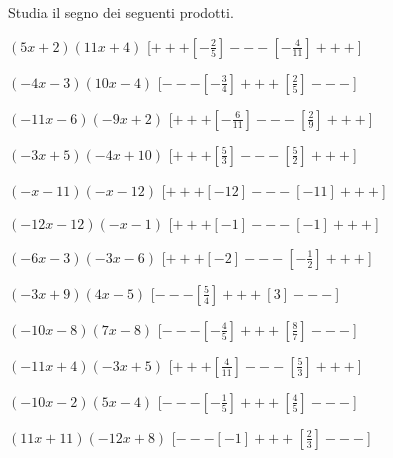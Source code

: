 \begin{esercizio}\label{ese:dis_6}
 Studia il segno dei seguenti prodotti.
 \begin{enumeratea}
  \item  $\left(5 x +2\right)\left(11 x +4\right)$ \hfill 
  [$+++\left [-\frac{2}{5} \right ]---\left [-\frac{4}{11} \right ]+++$]
  \item  $\left(-4 x -3\right)\left(10 x -4\right)$ \hfill 
  [$---\left [-\frac{3}{4} \right ]+++\left [\frac{2}{5} \right ]---$]
  \item  $\left(-11 x -6\right)\left(-9 x +2\right)$ \hfill 
  [$+++\left [-\frac{6}{11} \right ]---\left [\frac{2}{9} \right ]+++$]
  \item  $\left(-3 x +5\right)\left(-4 x +10\right)$ \hfill 
  [$+++\left [\frac{5}{3} \right ]---\left [\frac{5}{2} \right ]+++$]
  \item  $\left(- x -11\right)\left(- x -12\right)$ \hfill 
  [$+++\left [-12 \right ]---\left [-11 \right ]+++$]
  \item  $\left(-12 x -12\right)\left(- x -1\right)$ \hfill 
  [$+++\left [-1 \right ]---\left [-1 \right ]+++$]
  \item  $\left(-6 x -3\right)\left(-3 x -6\right)$ \hfill 
  [$+++\left [-2 \right ]---\left [-\frac{1}{2} \right ]+++$]
  \item  $\left(-3 x +9\right)\left(4 x -5\right)$ \hfill 
  [$---\left [\frac{5}{4} \right ]+++\left [3 \right ]---$]
  \item  $\left(-10 x -8\right)\left(7 x -8\right)$ \hfill 
  [$---\left [-\frac{4}{5} \right ]+++\left [\frac{8}{7} \right ]---$]
  \item  $\left(-11 x +4\right)\left(-3 x +5\right)$ \hfill 
  [$+++\left [\frac{4}{11} \right ]---\left [\frac{5}{3} \right ]+++$]
  \item  $\left(-10 x -2\right)\left(5 x -4\right)$ \hfill 
  [$---\left [-\frac{1}{5} \right ]+++\left [\frac{4}{5} \right ]---$]
  \item  $\left(11 x +11\right)\left(-12 x +8\right)$ \hfill 
  [$---\left [-1 \right ]+++\left [\frac{2}{3} \right ]---$]
 \end{enumeratea}
\end{esercizio}

\subsubsection*{}

